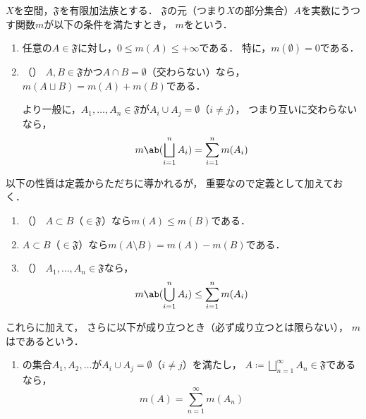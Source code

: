 \documentclass[../sotsu.tex]{subfiles}
\begin{document}
\begin{definition}
    \label{dfn:content-measure}
    $X$を空間，$𝔉$を有限加法族とする．
    $𝔉$の元（つまり$X$の部分集合）$A$を実数にうつす関数$m$が以下の条件を満たすとき，
    $m$をという．
    \begin{enumerate}
        \item \label{content-measure:positivity}
            任意の$A \in 𝔉$に対し，$0 \leq m(A) \leq +\infty$である．
            特に，$m(\emptyset) = 0$である．
        \item \label{content-measure:additivity}（）
            $A, B \in 𝔉$かつ$A \cap B = \emptyset$（交わらない）なら，
            $m(A \sqcup B) = m(A) + m(B)$である．

            より一般に，$A_1, \dots, A_n \in 𝔉$が$A_i \cup A_j = \emptyset$（$i \neq j$），
            つまり互いに交わらないなら，
            \begin{equation*}
                m \ab( \bigsqcup_{i=1}^{n} A_i ) = \sum_{i=1}^{n} m(A_i)
            \end{equation*}
    \end{enumerate}
    以下の性質は定義からただちに導かれるが，
    重要なので定義として加えておく．
    \begin{enumerate}[resume]
        \item \label{content-measure:monotonicity}（）
            $A \subset B$（$\in 𝔉$）なら$m(A) \leq m(B)$である．
        \item $A \subset B$（$\in 𝔉$）なら$m(A \setminus B) = m(A) - m(B)$である．
        \item \label{content-measure:subadditivity}（）
            $A_1, \dots, A_n \in 𝔉$なら，
            \begin{equation*}
                m \ab( \bigcup_{i=1}^{n} A_i ) \leq \sum_{i=1}^{n} m(A_i)
            \end{equation*}
    \end{enumerate}
    これらに加えて，
    さらに以下が成り立つとき（必ず成り立つとは限らない），
    $m$はであるという．
    \begin{enumerate}[resume]
        \item {}の集合$A_1, A_2, \dotsc$が$A_i \cup A_j = \emptyset$（$i \neq j$）を満たし，
            $A \coloneq \bigsqcup_{n=1}^{\infty} A_n \in 𝔉$であるなら，
            \begin{equation*}
                m(A) = \sum_{n=1}^{\infty} m(A_n)
            \end{equation*}
    \end{enumerate}
\end{definition}
\end{document}
